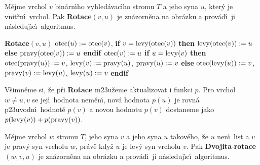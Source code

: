 \flushpar M\v ejme vrchol $v$ bin\'arn\'\i ho vyhled\'avac\'\i ho stromu $
T$ a 
jeho syna $u$, kter\'y je vnit\v rn\'\i\ vrchol.  Pak {\bf Rotace$
(v,u)$} je 
zn\'azorn\v ena na obr\'azku a prov\'ad\'\i\ ji n\'asleduj\'\i c\'\i\ algoritmus.  
\bigskip

\midinsert
\centerline{}
\endcaption
\endinsert
\medskip

{\bf Rotace$(v,u)$\newline} 
$\operatorname{otec}(u):=\operatorname{otec}(v)$,\newline 
{\bf if} $v=\operatorname{levy}(\operatorname{otec}(v))$ {\bf then}\newline 
\phantom{---}$\operatorname{levy}(\operatorname{otec}(v)):=u$\newline 
{\bf else}\newline 
\phantom{---}$\operatorname{pravy}(\operatorname{otec}(v)):=u$\newline 
{\bf endif\newline 
$\operatorname{otec}(v):=u$\newline 
if} $u=\operatorname{levy}(v)$ {\bf then}\newline 
\phantom{---}$\operatorname{otec}(\operatorname{pravy}(u)):=v$, $\operatorname{levy}(v):=\operatorname{pravy}(u)$, $\operatorname{pravy}(u):=v$\newline 
{\bf else}\newline 
\phantom{---}$\operatorname{otec}(\operatorname{levy}(u)):=v$, $\operatorname{pravy}(v):=\operatorname{levy}(u)$, $\operatorname{levy}(u):=v$\newline 
{\bf endif}
\medskip

\flushpar V\v simn\v eme si, \v ze p\v ri {\bf Rotace} m\accent23u\v zeme 
aktualizovat i funkci $p$. Pro vrchol $w\ne u,v$ se jej\'\i\ hodnota 
nem\v en\'\i , nov\'a hodnota $p(u)$ je rovn\'a p\accent23uvodn\'\i\ hodnot\v e 
$p(v)$ a novou hodnotu $p(v)$ dostaneme jako 
$p(\operatorname{levy}(v))+p(\operatorname{pravy}(v))$.
\medskip

\flushpar M\v ejme vrchol $w$ stromu $T$, jeho syna $v$ a jeho 
syna $u$ takov\'eho, \v ze $u$ nen\'\i\ list a $v$ je prav\'y syn 
vrcholu $w$, pr\'av\v e kdy\v z $u$ je lev\'y syn vrcholu $v$. Pak 
{\bf Dvojita}-{\bf rotace$(w,v,u)$} je zn\'azorn\v ena na obr\'azku a prov\'ad\'\i\ 
ji n\'asleduj\'\i c\'\i\ algoritmus.

\midinsert
\centerline{}
\endcaption
\endinsert
\medskip

